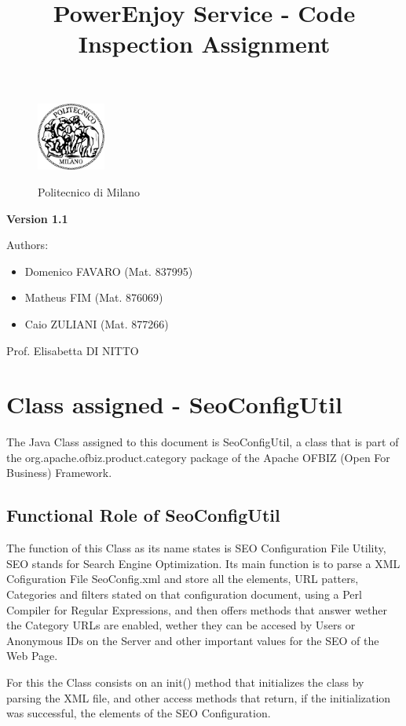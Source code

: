 \documentclass[a4paper]{article}
\title{PowerEnjoy Service - Code Inspection Assignment}
\begin{document}
\begin{titlepage}
\begin{figure}
\centering
\includegraphics[width=0.2\textwidth]{polimi.jpg}
\par
\LARGE Politecnico di Milano
\end{figure}


\maketitle
\textbf{Version 1.1}
\newline

\raggedright
Authors:
\begin{itemize}
	\item Domenico FAVARO (Mat. 837995)
        	\item Matheus FIM (Mat. 876069)
	\item Caio ZULIANI (Mat. 877266)	
\end{itemize}
\raggedleft
Prof. Elisabetta DI NITTO
\thispagestyle{empty}
\end{titlepage}

\tableofcontents
\newpage
 
\section{Class assigned - SeoConfigUtil}

The Java Class assigned to this document is \ttfamily SeoConfigUtil\rmfamily, a class that is part of the \ttfamily org.apache.ofbiz.product.category \rmfamily package of the Apache OFBIZ (Open For Business) Framework. 

\subsection{Functional Role of SeoConfigUtil}

The function of this Class as its name states is SEO Configuration File Utility, SEO stands for Search Engine Optimization. Its main function is to parse a XML Cofiguration File \ttfamily SeoConfig.xml \rmfamily and store all the elements, URL patters, Categories and filters stated on that configuration document, using a Perl Compiler for Regular Expressions, and then offers methods that answer wether the Category URLs are enabled, wether they can be accesed by Users or Anonymous IDs on the Server and other important values for the SEO of the Web Page.\newline 
\par
For this the Class consists on an \ttfamily init() \rmfamily method that initializes the class by parsing the XML file, and other access methods that return, if the initialization was successful, the elements of the SEO Configuration.
\end{document}
